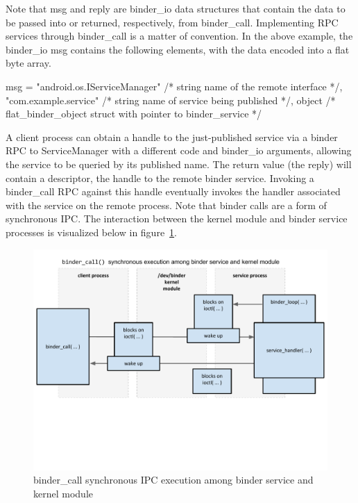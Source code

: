 \documentclass[prodmode]{acmlarge}
\begin{document}
Note that msg and reply are binder\_io data structures that contain the data to be passed into or returned, respectively, from binder\_call. Implementing RPC services through binder\_call is a matter of convention. In the above example, the binder\_io msg contains the following elements, with the data encoded into a flat byte array.

\begin{snippet}[caption=contents of msg passed into binder\_call]
msg = {
  "android.os.IServiceManager" /* string name of the remote interface */,
  "com.example.service" /* string name of service being published */,
  object /* flat_binder_object struct with pointer to binder_service */
}
\end{snippet}

A client process can obtain a handle to the just-published service via a binder RPC to ServiceManager with a different code and binder\_io arguments, allowing the service to be queried by its published name. The return value (the reply) will contain a descriptor, the handle to the remote binder service. Invoking a binder\_call RPC against this handle eventually invokes the handler associated with the service on the remote process. Note that binder calls are a form of synchronous IPC. The interaction between the kernel module and binder service processes is visualized below in figure~\ref{fig:binder_call}.
\begin{figure}[h]
\centering
\includegraphics[width=\textwidth]{drawings/binder_call.pdf}
\caption{binder\_call synchronous IPC execution among binder service and kernel module}
\label{fig:binder_call}
\end{figure}
\end{document}
